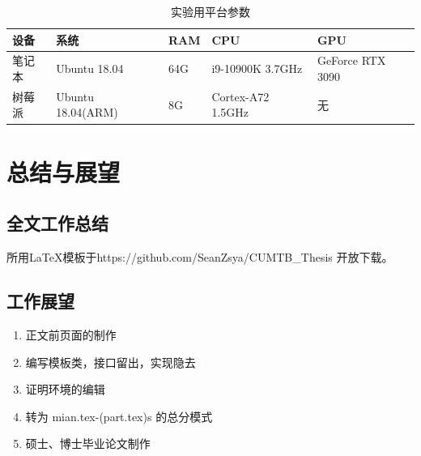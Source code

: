 \documentclass[UTF8,AutoFakeBold=1.3,fixskip = true]{ctexart}
\numberwithin{figure}{section}
\numberwithin{table}{section}
\numberwithin{equation}{section}
\begin{document}
		\begin{table}[h] 
			\caption{实验用平台参数}
			\label{table:param}
			\centering
			\begin{tabular}{p{30pt}p{100pt}p{30pt}p{90pt}p{80pt}}
 			\hline
			\begin{minipage}{3.5cm}\vspace{2mm}设备 \vspace{2mm} \end{minipage} & 系统& RAM & CPU & GPU \\
 			\hline
			\begin{minipage}{3.5cm}\vspace{2mm}笔记本 \vspace{2mm} \end{minipage}  & Ubuntu 18.04   & 64G & i9-10900K 3.7GHz & GeForce RTX 3090 \\
			\begin{minipage}{3.5cm}\vspace{2mm}树莓派 \vspace{2mm} \end{minipage}   & Ubuntu 18.04(ARM) &8G& Cortex-A72 1.5GHz & 无\\
		 	\hline	
			\end{tabular}
		\end{table}




\newpage
\section{总结与展望}
	\subsection{全文工作总结}
		\par 所用\LaTeX 模板于https://github.com/SeanZsya/CUMTB\_Thesis 开放下载。
		\par 
	\subsection{工作展望}
		\begin{enumerate}[\hspace{2em}(1)]
			\item 正文前页面的制作
			\item 编写模板类，接口留出，实现隐去
			\item 证明环境的编辑
			\item 转为 mian.tex-(part.tex)s 的总分模式
			\item 硕士、博士毕业论文制作
		\end{enumerate}
\end{document}
